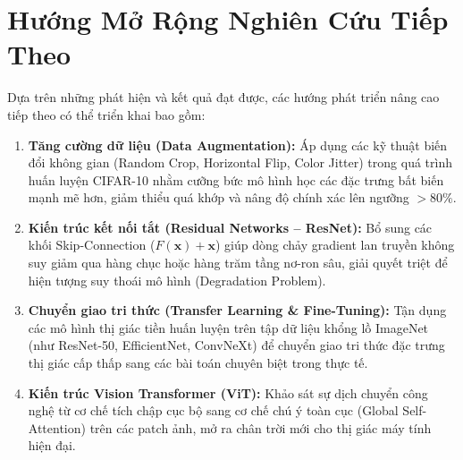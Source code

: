 \documentclass[12pt,a4paper]{report}
\begin{document}
\section{Hướng Mở Rộng Nghiên Cứu Tiếp Theo}
Dựa trên những phát hiện và kết quả đạt được, các hướng phát triển nâng cao tiếp theo có thể triển khai bao gồm:
\begin{enumerate}
    \item \textbf{Tăng cường dữ liệu (Data Augmentation):} Áp dụng các kỹ thuật biến đổi không gian (Random Crop, Horizontal Flip, Color Jitter) trong quá trình huấn luyện CIFAR-10 nhằm cưỡng bức mô hình học các đặc trưng bất biến mạnh mẽ hơn, giảm thiểu quá khớp và nâng độ chính xác lên ngưỡng $>80\%$.
    \item \textbf{Kiến trúc kết nối tắt (Residual Networks -- ResNet):} Bổ sung các khối Skip-Connection ($F(\mathbf{x}) + \mathbf{x}$) giúp dòng chảy gradient lan truyền không suy giảm qua hàng chục hoặc hàng trăm tầng nơ-ron sâu, giải quyết triệt để hiện tượng suy thoái mô hình (Degradation Problem).
    \item \textbf{Chuyển giao tri thức (Transfer Learning \& Fine-Tuning):} Tận dụng các mô hình thị giác tiền huấn luyện trên tập dữ liệu khổng lồ ImageNet (như ResNet-50, EfficientNet, ConvNeXt) để chuyển giao tri thức đặc trưng thị giác cấp thấp sang các bài toán chuyên biệt trong thực tế.
    \item \textbf{Kiến trúc Vision Transformer (ViT):} Khảo sát sự dịch chuyển công nghệ từ cơ chế tích chập cục bộ sang cơ chế chú ý toàn cục (Global Self-Attention) trên các patch ảnh, mở ra chân trời mới cho thị giác máy tính hiện đại.
\end{enumerate}
\end{document}
